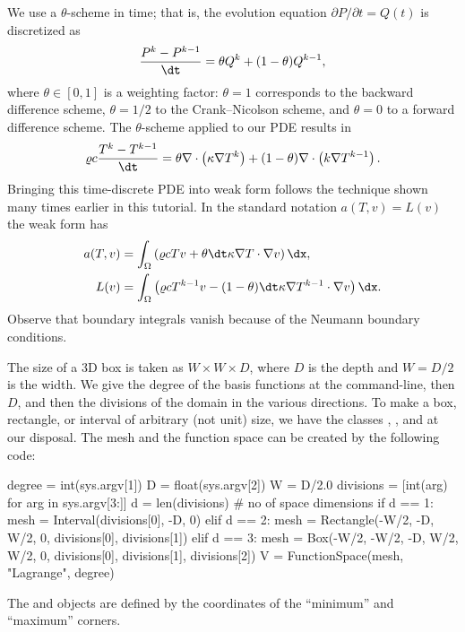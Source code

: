 We use a $\theta$-scheme in time; that is, the evolution equation
$\partial P/\partial t=Q(t)$ is discretized as
\begin{equation}
   \frac{P^k - P^{k-1}}{\dt} = \theta Q^k + (1-\theta )Q^{k-1},
\end{equation}
where $\theta\in[0,1]$ is a weighting factor: $\theta =1$
corresponds to the backward difference scheme, $\theta =1/2$ to the
Crank--Nicolson scheme, and $\theta =0$ to a forward difference scheme.
The $\theta$-scheme applied to our PDE results in
\begin{align}
\varrho c \frac{T^k-T^{k-1}}{\dt} =
\theta \nabla\cdot\left( \kappa\nabla T^k\right)
+ (1-\theta) \nabla\cdot\left( k\nabla T^{k-1}\right).
\end{align}
Bringing this time-discrete PDE into weak form follows the technique
shown many times earlier in this tutorial. In the standard notation
$a(T,v)=L(v)$ the weak form has
\begin{align}
a(T,v) &= \int_\Omega
\left( \varrho c Tv + \theta{\dt} \kappa\nabla T\cdot \nabla v\right)\dx,
\\
L(v) &= \int_\Omega \left( \varrho c T^{k-1}v - (1-\theta){\dt}
\kappa\nabla T^{k-1}\cdot \nabla v\right)\dx.
\end{align}
Observe that boundary integrals vanish because of the Neumann boundary
conditions.

The size of a 3D box is taken as $W \times W \times D$, where
$D$ is the depth and $W=D/2$ is the width.   We give the degree of the basis
functions at the command-line, then $D$, and then the divisions of the
domain in the various directions.  To make a box, rectangle, or interval
of arbitrary (not unit) size, we have the \dolfin{} classes ,
, and  at our disposal. The mesh and the
function space can be created by the following code:
\begin{python}
degree = int(sys.argv[1])
D = float(sys.argv[2])
W = D/2.0
divisions = [int(arg) for arg in sys.argv[3:]]
d = len(divisions)  # no of space dimensions
if d == 1:
    mesh = Interval(divisions[0], -D, 0)
elif d == 2:
    mesh = Rectangle(-W/2, -D, W/2, 0, divisions[0], divisions[1])
elif d == 3:
    mesh = Box(-W/2, -W/2, -D, W/2, W/2, 0,
               divisions[0], divisions[1], divisions[2])
V = FunctionSpace(mesh, "Lagrange", degree)
\end{python}
The  and  objects are defined by the coordinates
of the ``minimum'' and ``maximum'' corners.

